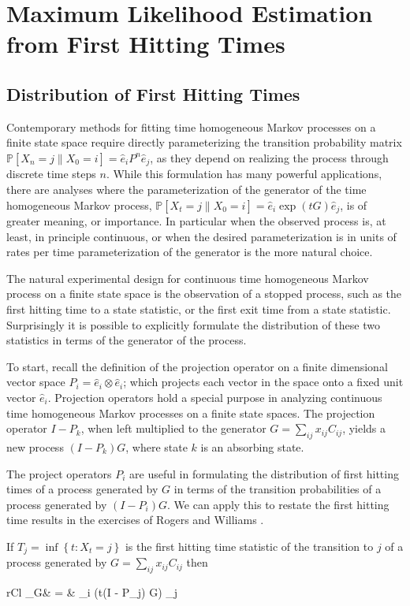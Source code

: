 \chapter{Maximum Likelihood Estimation from First Hitting Times}
\section{Distribution of First Hitting Times}
Contemporary methods for fitting time homogeneous Markov processes on a finite 
state space require directly parameterizing the transition probability matrix $\mathbb{P}\left[X_n = j \left\|X_0 = i \right.\right] = \hat{e}_i P^n \hat{e}_j$,
as they depend on realizing the process through discrete time steps $n$. While this 
formulation has many powerful applications, there are analyses where the parameterization of 
the generator of the time homogeneous Markov process, $\mathbb{P}\left[X_t = j \left\|X_0 = i \right.\right] = \hat{e}_i \exp\left({tG}\right) \hat{e}_j$, 
is of greater meaning, or importance. In particular when the observed process is, at least,
in principle continuous, or when the desired parameterization is in units of rates per time
parameterization of the generator is the more natural choice.

The natural experimental design for continuous time homogeneous Markov process on a finite
state space is the observation of a stopped process, such as the first hitting time to a
state statistic, or the first exit time from a state statistic. Surprisingly it is possible
to explicitly formulate the distribution of these two statistics in terms of the generator
of the process.

To start, recall the definition of the projection operator on a finite dimensional vector
space $P_i = \hat{e}_i \otimes \hat{e}_i$; which projects each vector in the space onto a
fixed unit vector $\hat{e}_i$. Projection operators hold a special purpose in analyzing
continuous time homogeneous Markov processes on a finite state spaces. The projection
operator $I-P_k$, when left multiplied to the generator $G = \sum_{ij}x_{ij}C_{ij}$, yields 
a new process $\left(I-P_k\right)G$, where state $k$ is an absorbing state.

The project operators $P_i$ are useful in formulating the distribution of first hitting 
times of a process generated by $G$ in terms of the transition probabilities of a process
generated by $\left(I-P_i\right)G$. We can apply this to restate the first hitting time 
results in the exercises of Rogers and Williams \cite{rogers_diffusions_2000}.
\begin{theorem}
	If $T_j = \inf\left\lbrace t: X_t=j\right\rbrace$ is the first 
	hitting time statistic of the transition to $j$ of a process generated by $G = \sum_{ij}x_{ij}C_{ij}$
	then
	\begin{IEEEeqnarray*}{rCl}
		_G\left[T_j \le t \left\| X_0=i \right.\right]
			& = & _i \exp\left(t\left(I - P_j\right) G\right) _j
	\end{IEEEeqnarray*}
\end{theorem}

